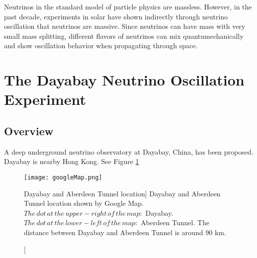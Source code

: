 Neutrinos in the standard model of particle physics are massless.
However, in the past decade, experiments in solar have shown indirectly through neutrino oscillation 
that neutrinos are massive. Since neutrinos can have mass with very small mass splitting, different flavors of neutrinos
can mix quantumechanically and show oscillation behavior when propagating through space.\cite{Perkins:ch1}\cite{Vahle:ch1}\cite{Fkuda:1998} \cite{SNO:2001} 




%
%
%
%
%
%





\section{The Dayabay Neutrino Oscillation Experiment}
\subsection{Overview}

A deep underground neutrino observatory at Dayabay, China, has
been proposed.\cite{DYBProposal:2007} \cite{TDR}
Dayabay is nearby Hong Kong. See Figure \ref{fig:googleMap.png}


\begin{figure}
    \centering
    \texttt{[image: googleMap.png]}
    \caption
    [Dayabay and Aberdeen Tunnel location]
    {Dayabay and Aberdeen Tunnel location shown by Google Map.
$The\,dot\,at\,the\,upper-right\,of\,the\,map:$ Dayabay.
$The\,dot\,at\,the\,lower-left\,of\,the\,map:$ Aberdeen Tunnel.
The distance between Dayabay and Aberdeen Tunnel is around 90 km.}
    \label{fig:googleMap.png}
    \end{figure}



